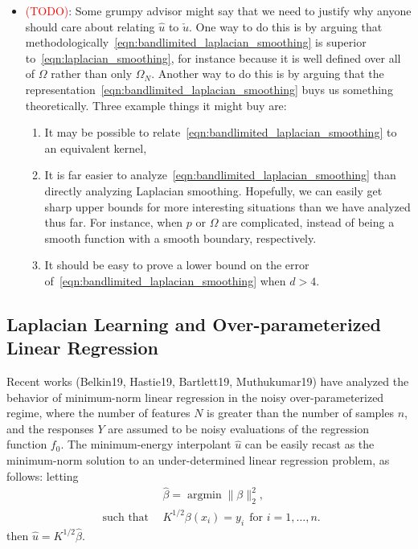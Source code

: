 \documentclass{article}
\newcommand{\1}{\mathbf{1}}
\DeclareMathOperator*{\argmin}{argmin}
\newcommand{\wh}[1]{\widehat{#1}}
\theoremstyle{definition}
\theoremstyle{remark}
\begin{document}
\begin{itemize}
	\item \textcolor{red}{(TODO)}: Some grumpy advisor might say that we need to justify why anyone should care about relating $\wh{u}$ to $\check{u}$. One way to do this is by arguing that methodologically~\eqref{eqn:bandlimited_laplacian_smoothing} is superior to~\eqref{eqn:laplacian_smoothing}, for instance because it is well defined over all of $\Omega$ rather than only $\Omega_N$. Another way to do this is by arguing that the representation~\eqref{eqn:bandlimited_laplacian_smoothing} buys us something theoretically. Three example things it might buy are: 
	\begin{enumerate}[(1)]
		\item It may be possible to relate~\eqref{eqn:bandlimited_laplacian_smoothing} to an equivalent kernel,
		\item It is far easier to analyze~\eqref{eqn:bandlimited_laplacian_smoothing} than directly analyzing Laplacian smoothing. Hopefully, we can easily get sharp upper bounds for more interesting situations than we have analyzed thus far. For instance, when $p$ or $\Omega$ are complicated, instead of being a smooth function with a smooth boundary, respectively. 
		\item It should be easy to prove a lower bound on the error of~\eqref{eqn:bandlimited_laplacian_smoothing} when $d > 4$. 
	\end{enumerate}
\end{itemize}


\subsection{Laplacian Learning and Over-parameterized Linear Regression}
Recent works (Belkin19, Hastie19, Bartlett19, Muthukumar19) have analyzed the behavior of minimum-norm linear regression in the noisy over-parameterized regime, where the number of features $N$ is greater than the number of samples $n$, and the responses $Y$ are assumed to be noisy evaluations of the regression function $f_0$. The minimum-energy interpolant $\wh{u}$ can be easily recast as the minimum-norm solution to an under-determined linear regression problem, as follows: letting
\begin{equation}
\begin{aligned}
& \wh{\beta} = \argmin \|\beta\|_2^2, \\
~~\textrm{such that} ~~& K^{1/2}\beta(x_i) = y_i~~\textrm{for~$i = 1,\ldots,n$.}
\end{aligned}
\end{equation}
then $\wh{u} = K^{1/2} \wh{\beta}$.
\end{document}
